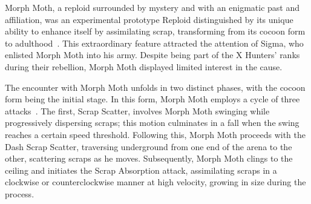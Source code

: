 Morph Moth, a reploid surrounded by mystery and with an enigmatic past and affiliation, was an experimental prototype Reploid distinguished by its unique ability to enhance itself by assimilating scrap, transforming from its cocoon form to adulthood~\cite{wiki:Morph_moth, wayback:X2_resources}. This extraordinary feature attracted the attention of Sigma, who enlisted Morph Moth into his army. Despite being part of the X Hunters' ranks during their rebellion, Morph Moth displayed limited interest in the cause.

The encounter with Morph Moth unfolds in two distinct phases, with the cocoon form being the initial stage. In this form, Morph Moth employs a cycle of three attacks~\cite{book:Compendium}. The first, Scrap Scatter, involves Morph Moth swinging while progressively dispersing scraps; this motion culminates in a fall when the swing reaches a certain speed threshold. Following this, Morph Moth proceeds with the Dash Scrap Scatter, traversing underground from one end of the arena to the other, scattering scraps as he moves. Subsequently, Morph Moth clings to the ceiling and initiates the Scrap Absorption attack, assimilating scraps in a clockwise or counterclockwise manner at high velocity, growing in size during the process. 

